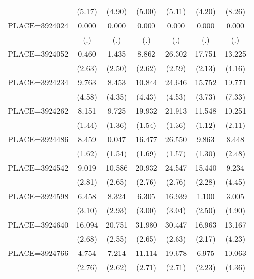 {\begin{tabular}{l*{6}{c}}
                    &      (5.17)&      (4.90)&      (5.00)&      (5.11)&      (4.20)&      (8.26)\\
PLACE=3924024       &       0.000&       0.000&       0.000&       0.000&       0.000&       0.000\\
                    &         (.)&         (.)&         (.)&         (.)&         (.)&         (.)\\
PLACE=3924052       &       0.460&       1.435&       8.862&      26.302&      17.751&      13.225\\
                    &      (2.63)&      (2.50)&      (2.62)&      (2.59)&      (2.13)&      (4.16)\\
PLACE=3924234       &       9.763&       8.453&      10.844&      24.646&      15.752&      19.771\\
                    &      (4.58)&      (4.35)&      (4.43)&      (4.53)&      (3.73)&      (7.33)\\
PLACE=3924262       &       8.151&       9.725&      19.932&      21.913&      11.548&      10.251\\
                    &      (1.44)&      (1.36)&      (1.54)&      (1.36)&      (1.12)&      (2.11)\\
PLACE=3924486       &       8.459&       0.047&      16.477&      26.550&       9.863&       8.448\\
                    &      (1.62)&      (1.54)&      (1.69)&      (1.57)&      (1.30)&      (2.48)\\
PLACE=3924542       &       9.019&      10.586&      20.932&      24.547&      15.440&       9.234\\
                    &      (2.81)&      (2.65)&      (2.76)&      (2.76)&      (2.28)&      (4.45)\\
PLACE=3924598       &       6.458&       8.324&       6.305&      16.939&       1.100&       3.005\\
                    &      (3.10)&      (2.93)&      (3.00)&      (3.04)&      (2.50)&      (4.90)\\
PLACE=3924640       &      16.094&      20.751&      31.980&      30.447&      16.963&      13.167\\
                    &      (2.68)&      (2.55)&      (2.65)&      (2.63)&      (2.17)&      (4.23)\\
PLACE=3924766       &       4.754&       7.214&      11.114&      19.678&       6.975&      10.063\\
                    &      (2.76)&      (2.62)&      (2.71)&      (2.71)&      (2.23)&      (4.36)\\

\end{tabular}}
